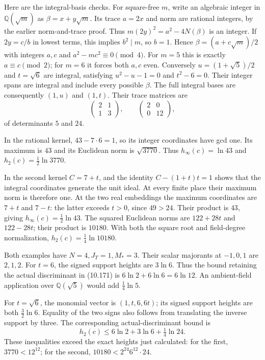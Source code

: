 \documentclass[
  11pt,
  a4paper,
]{article}
\begin{document}
Here are the integral-basis checks. For square-free \(m\), write an
algebraic integer in \(\mathbb Q(\sqrt m)\) as \(\beta=x+y\sqrt m\). Its
trace \(a=2x\) and norm are rational integers, by the earlier
norm-and-trace proof. Thus \(m(2y)^2=a^2-4N(\beta)\) is an integer. If
\(2y=c/b\) in lowest terms, this implies \(b^2\mid m\), so \(b=1\).
Hence \(\beta=(a+c\sqrt m)/2\) with integers \(a,c\) and
\(a^2-mc^2\equiv0\pmod4\). For \(m=5\) this is exactly
\(a\equiv c\pmod2\); for \(m=6\) it forces both \(a,c\) even. Conversely
\(u=(1+\sqrt5)/2\) and \(t=\sqrt6\) are integral, satisfying
\(u^2-u-1=0\) and \(t^2-6=0\). Their integer spans are integral and
include every possible \(\beta\). The full integral bases are
consequently \((1,u)\) and \((1,t)\). Their trace matrices are \[
\begin{pmatrix}2&1\\1&3\end{pmatrix},
\qquad
\begin{pmatrix}2&0\\0&12\end{pmatrix},
\] of determinants \(5\) and \(24\).

In the rational kernel, \(43-7\cdot6=1\), so its integer coordinates
have gcd one. Its maximum is \(43\) and its Euclidean norm is
\(\sqrt{3770}\). Thus \(h_\infty(c)=\ln43\) and
\(h_2(c)=\tfrac12\ln3770\).

In the second kernel \(C=7+t\), and the identity \(C-(1+t)t=1\) shows
that the integral coordinates generate the unit ideal. At every finite
place their maximum norm is therefore one. At the two real embeddings
the maximum coordinates are \(7+t\) and \(7-t\): the latter exceeds
\(t>0\), since \(49>24\). Their product is \(43\), giving
\(h_\infty(c)=\tfrac12\ln43\). The squared Euclidean norms are
\(122+28t\) and \(122-28t\); their product is \(10180\). With both the
square root and field-degree normalization, \(h_2(c)=\tfrac14\ln10180\).

Both examples have \(N=4,J_T=1,M_*=3\). Their scalar majorants at
\(-1,0,1\) are \(2,1,2\). For \(t=6\), the signed support heights are
\(3\ln6\). Thus the bound retaining the actual discriminant in (10.171)
is \(6\ln2+6\ln6=6\ln12\). An ambient-field application over
\(\mathbb Q(\sqrt5)\) would add \(\tfrac14\ln5\).

For \(t=\sqrt6\), the monomial vector is \((1,t,6,6t)\); its signed
support heights are both \(\tfrac32\ln6\). Equality of the two signs
also follows from translating the inverse support by three. The
corresponding actual-discriminant bound is \[
h_2(c)\le6\ln2+3\ln6+\tfrac14\ln24.
\] These inequalities exceed the exact heights just calculated: for the
first, \(3770<12^{12}\); for the second, \(10180<2^{24}6^{12}\cdot24\).
\end{document}
